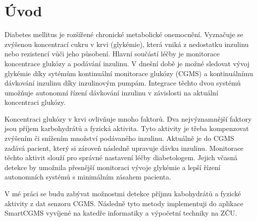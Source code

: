 \chapter{Úvod}

Diabetes mellitus je rozšířené chronické metabolické onemocnění. Vyznačuje se zvýšenou koncentrací cukru v krvi (glykémie), která vniká z nedostatku inzulinu nebo rezistencí vůči jeho působení. Hlavní součástí léčby je monitorace koncentrace glukózy a podávání inzulinu. V dnešní době je možné sledovat vývoj glykémie díky sytémům kontinuální monitorace glukózy (CGMS) a kontinuálnímu dávkování inzulinu díky inzulinovým pumpám. Integrace těchto dvou systémů umožňuje autonomní řízení dávkování inzulinu v závislosti na aktuální koncentraci glukózy.

Koncentraci glukózy v krvi ovlivňuje mnoho faktorů. Dva nejvýznamnější faktory jsou příjem karbohydrátů a fyzická aktivita. Tyto aktivity je třeba kompenzovat zvýšením či snížením množství podávaného inzulinu. Aktuálně je do CGMS zadává pacient, který si zároveň následně upravuje dávku inzulinu. Monitorace těchto aktivit slouží pro správné nastavení léčby diabetologem. Jejich včasná detekce by umožnila přesnější monitoraci vývoje glykémie a lepší řízení autonomních systémů s minimálním zásahem pacienta.

V mé práci se budu zabývat možnostmi detekce příjmu kabohydrátů a fyzické aktivity z dat senzoru CGMS. Následně tyto metody implementuji do aplikace SmartCGMS vyvíjené na katedře informatiky a výpočetní techniky na ZČU.